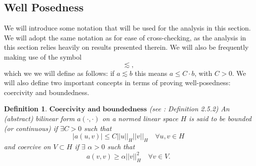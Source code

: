 \documentclass[12pt,a4paper]{article}
\newtheorem{definition}[theorem]{Definition}
\theoremstyle{definition}
\begin{document}
\subsection{Well Posedness}\label{sec_wellposed}
We will introduce some notation that will be used for the analysis in this section.  We will adopt the same notation as \cite{Chen2016} for ease of cross-checking, as the analysis in this section relies heavily on results presented therein. 
We will also be frequently making use of the symbol
\begin{equation}
	\lesssim \nonumber,
\end{equation}
which we we will define as follows: if $a\lesssim b$ this means $a\leq C\cdot b$, with $C>0$.  We will also define two important concepts in terms of proving well-posedness: coercivity and boundedness.
\theoremstyle{definition}
\begin{definition}{$\textbf{Coercivity and boundedness}$} (see \cite{brenner2007mathematical}: Definition 2.5.2)
	An (abstract) bilinear form $a\left(\cdot,\cdot\right)$ on a normed linear space $H$ is said  to be bounded (or continuous) if $\exists C > 0$ such that
	\begin{equation}
		\left|a\left(u,v\right)\right|\leq C \left|\left|u\right|\right|_H\left|\left|v\right|\right|_H \quad \forall u,v \in H\nonumber
	\end{equation}
	and coercive on $V\subset H$ if $\exists$ $\alpha > 0$ such that
	\begin{equation}
	a\left(v,v\right)\geq \alpha \left|\left|v\right|\right|_H^2\quad \forall v \in V\nonumber.
	\end{equation}
\end{definition}
\end{document}
